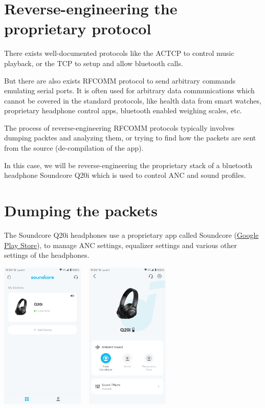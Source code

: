 \documentclass{article}
\theoremstyle{mytheoremstyle}
\theoremstyle{mytheoremstyle}
\theoremstyle{myproblemstyle}
\begin{document}
\section{Reverse-engineering the proprietary protocol}

There exists well-documented protocols like the ACTCP to control music playback,
or the TCP to setup and allow bluetooth calls.

But there are also exists RFCOMM protocol to send arbitrary commands emulating serial ports.
It is often used for arbitrary data communications which cannot be covered in the standard protocols,
like health data from smart watches, proprietary headphone control apps, bluetooth enabled weighing scales, etc.

The process of reverse-engineering RFCOMM protocols typically involves dumping packtes and analyzing them,
or trying to find how the packets are sent from the source (de-compilation of the app)\cite{bt-re-article}.

In this case, we will be reverse-engineering the proprietary stack of a bluetooth headphone Soundcore Q20i which is used to control ANC and sound profiles.

\section{Dumping the packets}

The Soundcore Q20i headphones use a proprietary app called Soundcore (\href{https://play.google.com/store/apps/details?id=com.oceanwing.soundcore}{Google Play Store}),
to manage ANC settings, equalizer settings and various other settings of the headphones.
\begin{center}
  \includegraphics[width=150px]{soundcore-app-connected}
  ~
  \includegraphics[width=150px]{soundcore-app-device}
\end{center}
\end{document}
